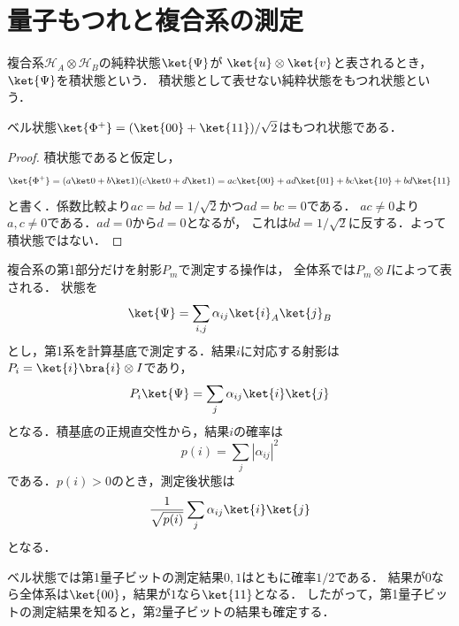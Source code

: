 \section{量子もつれと複合系の測定}
\label{sec:entanglement-measurement}

\begin{defi}[積状態と量子もつれ]
複合系$\mathcal H_A\otimes\mathcal H_B$の純粋状態$\ket{\Psi}$が
$\ket{u}\otimes\ket{v}$と表されるとき，$\ket{\Psi}$を積状態という．
積状態として表せない純粋状態をもつれ状態という．
\end{defi}

\begin{prop}
ベル状態$\ket{\Phi^+}=(\ket{00}+\ket{11})/\sqrt2$はもつれ状態である．
\end{prop}
\begin{proof}
積状態であると仮定し，
\[
 \ket{\Phi^+}=(a\ket0+b\ket1)(c\ket0+d\ket1)
 =ac\ket{00}+ad\ket{01}+bc\ket{10}+bd\ket{11}
\]
と書く．係数比較より$ac=bd=1/\sqrt2$かつ$ad=bc=0$である．
$ac\ne0$より$a,c\ne0$である．$ad=0$から$d=0$となるが，
これは$bd=1/\sqrt2$に反する．よって積状態ではない．
\end{proof}

複合系の第1部分だけを射影$P_m$で測定する操作は，
全体系では$P_m\otimes I$によって表される．
状態を
\begin{equation}
 \ket{\Psi}=\sum_{i,j}\alpha_{ij}\ket{i}_A\ket{j}_B
 \label{eq:general-bipartite-state}
\end{equation}
とし，第1系を計算基底で測定する．結果$i$に対応する射影は
$P_i=\ket{i}\bra{i}\otimes I$であり，
\[
 P_i\ket{\Psi}=\sum_j\alpha_{ij}\ket{i}\ket{j}
\]
となる．積基底の正規直交性から，結果$i$の確率は
\begin{equation}
 p(i)=\sum_j|\alpha_{ij}|^2
 \label{eq:partial-measurement-probability}
\end{equation}
である．$p(i)>0$のとき，測定後状態は
\begin{equation}
 \frac{1}{\sqrt{p(i)}}\sum_j\alpha_{ij}\ket{i}\ket{j}
 \label{eq:partial-post-measurement-state}
\end{equation}
となる．

ベル状態では第1量子ビットの測定結果$0,1$はともに確率$1/2$である．
結果が$0$なら全体系は$\ket{00}$，結果が$1$なら$\ket{11}$となる．
したがって，第1量子ビットの測定結果を知ると，第2量子ビットの結果も確定する．

